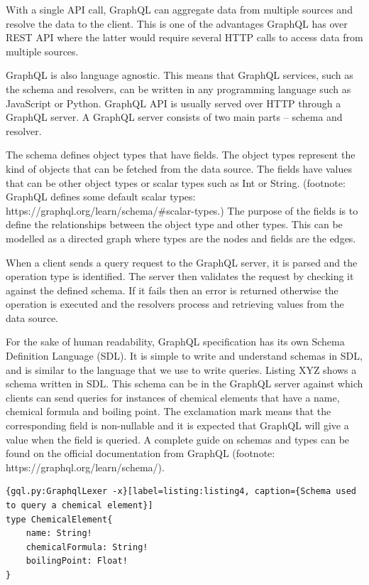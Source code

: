 With a single API call, GraphQL can aggregate data from multiple sources and resolve the data to the client. This is one of the advantages GraphQL has over REST API where the latter would require several HTTP calls to access data from multiple sources. 

GraphQL is also language agnostic. This means that GraphQL services, such as the schema and resolvers, can be written in any programming language such as JavaScript or Python. GraphQL API is usually served over HTTP through a GraphQL server. A GraphQL server consists of two main parts – schema and resolver. 

The schema defines object types that have fields. The object types represent the kind of objects that can be fetched from the data source. The fields have values that can be other object types or scalar types such as Int or String. (footnote: GraphQL defines some default scalar types: https://graphql.org/learn/schema/\#scalar-types.) The purpose of the fields is to define the relationships between the object type and other types. This can be modelled as a directed graph where types are the nodes and fields are the edges. 

When a client sends a query request to the GraphQL server, it is parsed and the operation type is identified. The server then validates the request by checking it against the defined schema. If it fails then an error is returned otherwise the operation is executed and the resolvers process and retrieving values from the data source.

For the sake of human readability, GraphQL specification has its own Schema Definition Language (SDL). It is simple to write and understand schemas in SDL, and is similar to the language that we use to write queries. Listing XYZ shows a schema written in SDL. This schema can be in the GraphQL server against which clients can send queries for instances of chemical elements that have a name, chemical formula and boiling point. The exclamation mark means that the corresponding field is non-nullable and it is expected that GraphQL will give a value when the field is queried. A complete guide on schemas and types can be found on the official documentation from GraphQL (footnote: https://graphql.org/learn/schema/). 


\begin{minipage}{\linewidth}
\begin{lstlisting}{gql.py:GraphqlLexer -x}[label=listing:listing4, caption={Schema used to query a chemical element}]
type ChemicalElement{
	name: String!
	chemicalFormula: String!
	boilingPoint: Float!
}

\end{lstlisting}
\end{minipage}

